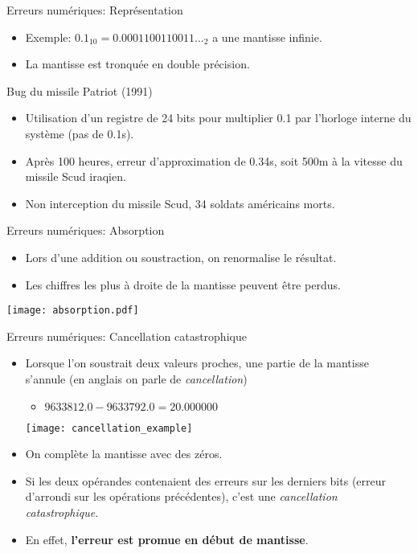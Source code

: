 \documentclass{beamer}
\begin{document}
\begin{frame}{Erreurs numériques: Représentation}
    \begin{itemize}
        \item Exemple: $0.1_{10} = 0.0001100110011\ldots_2$ a une mantisse infinie.
        \item La mantisse est tronquée en double précision.
    \end{itemize}
    \begin{block}{Bug du missile Patriot (1991)}
        \begin{itemize}
            \item Utilisation d'un registre de 24 bits pour multiplier 0.1 par l'horloge interne du système (pas de 0.1s).
            \item Après 100 heures, erreur d'approximation de 0.34s, soit 500m à la vitesse du missile Scud iraqien.
            \item Non interception du missile Scud, 34 soldats américains morts.
        \end{itemize}
    \end{block}
\end{frame}

\begin{frame}{Erreurs numériques: Absorption}
    \begin{itemize}
        \item Lors d'une addition ou soustraction, on renormalise le résultat.
        \item Les chiffres les plus à droite de la mantisse peuvent être perdus.
    \end{itemize}
    \hfill
    \center\texttt{[image: absorption.pdf]}
\end{frame}

\begin{frame}{Erreurs numériques: Cancellation catastrophique}
    \begin{itemize}
        \item Lorsque l'on soustrait deux valeurs proches, une partie de la mantisse s'annule (en anglais on parle de \emph{cancellation})
              \begin{itemize}
                  \item $9633812.0 - 9633792.0 = 20.000000$
              \end{itemize}
              \vspace{.25cm}
              \texttt{[image: cancellation\_example]}
              \vspace{.25cm}
        \item On complète la mantisse avec des zéros.
        \item Si les deux opérandes contenaient des erreurs sur les derniers bits (erreur d'arrondi sur les opérations précédentes), c'est une \emph{cancellation catastrophique}.
        \item En effet, \textbf{l'erreur est promue en début de mantisse}.
    \end{itemize}
\end{frame}
\end{document}
